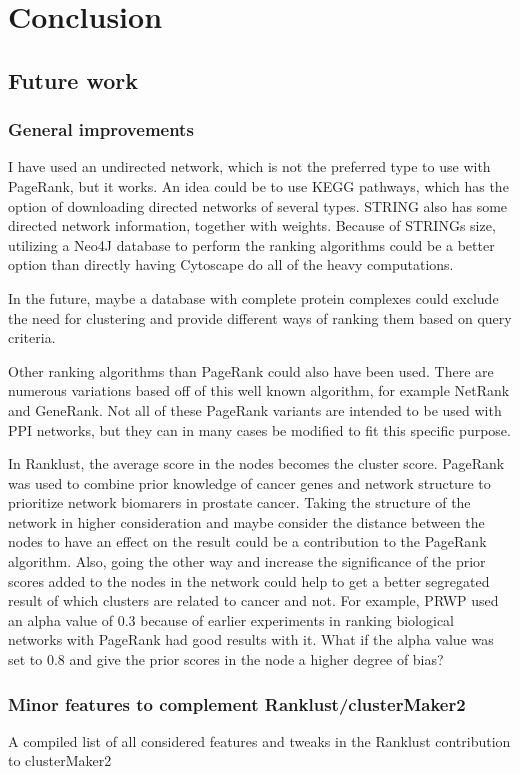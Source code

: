 \chapter{Conclusion}
\section{Future work}
\subsection{General improvements}
I have used an undirected network, which is not the preferred type to use with
PageRank, but it works. An idea could be to use KEGG pathways\cite{kegg}, which
has the option of downloading directed networks of several types.
STRING\cite{str} also has some directed network information, together with
weights. Because of STRINGs size, utilizing a Neo4J database to perform the
ranking algorithms could be a better option than directly having Cytoscape do
all of the heavy computations.

In the future, maybe a database with complete protein complexes could exclude
the need for clustering and provide different ways of ranking them based on
query criteria.

Other ranking algorithms than PageRank could also have been used. There are
numerous variations based off of this well known algorithm, for example NetRank
and GeneRank\cite{netrank,generank}. Not all of these PageRank variants are
intended to be used with PPI networks, but they can in many cases be modified to
fit this specific purpose.

In Ranklust, the average score in the nodes becomes the cluster score. PageRank
was used to combine prior knowledge of cancer genes and network structure to
prioritize network biomarers in prostate cancer. Taking the structure of the
network in higher consideration and maybe consider the distance between the
nodes to have an effect on the result could be a contribution to the PageRank
algorithm. Also, going the other way and increase the significance of the prior
scores added to the nodes in the network could help to get a better segregated
result of which clusters are related to cancer and not. For example, PRWP used
an alpha value of 0.3 because of earlier experiments in ranking biological
networks with PageRank had good results with it. What if the alpha value was set
to 0.8 and give the prior scores in the node a higher degree of bias?

\subsection{Minor features to complement Ranklust/clusterMaker2}
A compiled list of all considered features and tweaks in the Ranklust
contribution to clusterMaker2

